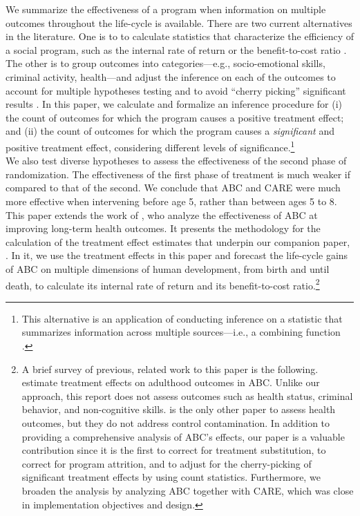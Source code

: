 \noindent We summarize the effectiveness of a program when information on multiple outcomes throughout the life-cycle is available. There are two current alternatives in the literature. One is to to calculate statistics that characterize the efficiency of a social program, such as the internal rate of return or the benefit-to-cost ratio \citep{Heckman_Moon_etal_2010_RateofReturn}. The other is to group outcomes into categories---e.g., socio-emotional skills, criminal activity, health---and adjust the inference on each of the outcomes to account for multiple hypotheses testing and to avoid ``cherry picking'' significant results \citep{Lehman_Romano_2005_AnnStat,Lehmann_Romano_2005_testing,Heckman_Moon_etal_2010_QE}. In this paper, we calculate and formalize an inference procedure for (i) the count of outcomes for which the program causes a positive treatment effect; and (ii) the count of outcomes for which the program causes a \emph{significant} and positive treatment effect, considering different levels of significance.\footnote{This alternative is an application of conducting inference on a statistic that summarizes information across multiple sources---i.e., a combining function \citep{Pesarin_Salmaso_2010_PermutationTests}.}\\

\noindent We also test diverse hypotheses to assess the effectiveness of the second phase of randomization. The effectiveness of the first phase of treatment is much weaker if compared to that of the second. We conclude that ABC and CARE were much more effective when intervening before age 5, rather than between ages 5 to 8.\\

\noindent This paper extends the work of \citet{Campbell_Conti_etal_2014_EarlyChildhoodInvestments}, who analyze the effectiveness of ABC at improving long-term health outcomes. It presents the methodology for the calculation of the treatment effect estimates that underpin our companion paper, \citet{Elango_et_al_2015_ABC_unpublished}. In it, we use the treatment effects in this paper and forecast the life-cycle gains of ABC on multiple dimensions of human development, from birth and until death, to calculate its internal rate of return and its benefit-to-cost ratio.\footnote{A brief survey of previous, related work to this paper is the following. \cite{Campbell_Pungello_etal_2012_DP} estimate treatment effects on adulthood outcomes in ABC. Unlike our approach, this report does not assess outcomes such as health status, criminal behavior, and non-cognitive skills. \cite{Campbell_Conti_etal_2014_EarlyChildhoodInvestments} is the only other paper to assess health outcomes, but they do not address control contamination. In addition to providing a comprehensive analysis of ABC's effects, our paper is a valuable contribution since it is the first to correct for treatment substitution, to correct for program attrition, and to adjust for the cherry-picking of significant treatment effects by using count statistics. Furthermore, we broaden the analysis by analyzing ABC together with CARE, which was close in implementation objectives and design.}\\

